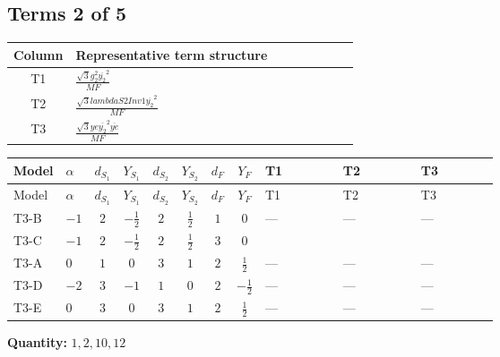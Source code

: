 \documentclass[8pt]{article}
\begin{document}
\begin{landscape}
\subsection*{Terms 2 of 5}
\begin{center}
\begin{tabular}{@{}c >{\raggedright\arraybackslash}p{0.82\linewidth}@{}}
\toprule
Column & Representative term structure \\
\midrule
T1 & \(\displaystyle \frac{\sqrt{3} g_{2}^{2} \overline{y_{2}}^{2}}{MF}\) \\
\midrule
T2 & \(\displaystyle \frac{\sqrt{3} lambdaS2Inv1 \overline{y_{2}}^{2}}{MF}\) \\
\midrule
T3 & \(\displaystyle \frac{\sqrt{3} ye \overline{y_{2}}^{2} \overline{ye}}{MF}\) \\
\midrule
\bottomrule
\end{tabular}
\end{center}
\smallskip
\tiny
\begin{longtable}{@{}llcccccc >{\raggedright\arraybackslash}p{0.21\linewidth} >{\raggedright\arraybackslash}p{0.21\linewidth} >{\raggedright\arraybackslash}p{0.21\linewidth}@{}}
\toprule
Model & $\alpha$ & $d_{S_1}$ & $Y_{S_1}$ & $d_{S_2}$ & $Y_{S_2}$ & $d_F$ & $Y_F$ & T1 & T2 & T3 \\
\midrule
\endfirsthead
\toprule
Model & $\alpha$ & $d_{S_1}$ & $Y_{S_1}$ & $d_{S_2}$ & $Y_{S_2}$ & $d_F$ & $Y_F$ & T1 & T2 & T3 \\
\midrule
\endhead
T3-B & $-1$ & $2$ & $-\frac{1}{2}$ & $2$ & $\frac{1}{2}$ & $1$ & $0$ & --- & --- & --- \\
\midrule
T3-C & $-1$ & $2$ & $-\frac{1}{2}$ & $2$ & $\frac{1}{2}$ & $3$ & $0$ & \scriptsize\adjustbox{max width=\linewidth}{$\begin{gathered} - \frac{\sqrt{3} g_{2}^{2} \overline{y_{2}}^{2}}{8 MF}\end{gathered}$} & \scriptsize\adjustbox{max width=\linewidth}{$\begin{gathered} - \frac{\sqrt{3} lambdaS2Inv1 \overline{y_{2}}^{2}}{12 MF}\end{gathered}$} & \scriptsize\adjustbox{max width=\linewidth}{$\begin{gathered} \frac{\sqrt{3} ye \overline{y_{2}}^{2} \overline{ye}}{24 MF}\end{gathered}$} \\
\midrule
T3-A & $0$ & $1$ & $0$ & $3$ & $1$ & $2$ & $\frac{1}{2}$ & --- & --- & --- \\
\midrule
T3-D & $-2$ & $3$ & $-1$ & $1$ & $0$ & $2$ & $-\frac{1}{2}$ & --- & --- & --- \\
\midrule
T3-E & $0$ & $3$ & $0$ & $3$ & $1$ & $2$ & $\frac{1}{2}$ & --- & --- & --- \\
\midrule
\bottomrule
\end{longtable}
\clearpage
\noindent\textbf{Quantity: }$\mathrm{1,2,10,12}$\par\smallskip

\end{landscape}
\end{document}
